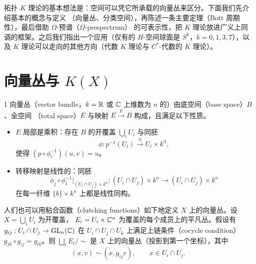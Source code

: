 
拓扑 $K$ 理论的基本想法是：空间可以凭它所承载的向量丛来区分。下面我们先介绍基本的概念与定义
（向量丛、分类空间），再陈述一条主要定理（Bott 周期性），最后借助 $\Omega$-预谱（$\Omega$-prespectrum）
的可表示性，把 $K$ 理论放进广义上同调的框架。之后我们指出一个应用（仅有的 $H$-空间球面是
$S^k$，$k=0,1,3,7$），以及 $K$ 理论可以走向的其他方向（代数 $K$ 理论与 $C^*$-代数的 $K$ 理论）。

\section{向量丛与 $K(X)$}

\begin{defn}{1}
  向量丛（vector bundle，$k=\mathbb{R}$ 或 $\mathbb{C}$ 上维数为 $n$ 的）由底空间（base space）$B$、全空间
  （total space）$E$ 与映射 $E\xrightarrow{p}B$ 构成，且满足以下性质。
  \begin{itemize}[leftmargin=1.6em,itemsep=2pt]
    \item $E$ 局部是乘积：存在 $B$ 的开覆盖 $\bigcup_i U_i$ 与同胚
      \[ \phi : p^{-1}(U_i) \xrightarrow{\ \cong\ } U_i\times k^n , \]
      使得 $(p\circ\phi_i^{-1})(u,v)=u$。
    \item 转移映射是线性的：同胚
      \[ \phi_j\circ\phi_i^{-1}\big|_{(U_i\cap U_j)\times k^n} :
         (U_i\cap U_j)\times k^n \longrightarrow (U_i\cap U_j)\times k^n \]
      在每一纤维 $\{b\}\times k^n$ 上都是线性同构。
  \end{itemize}
\end{defn}

人们也可以用粘合函数（clutching functions）如下地定义 $X$ 上的向量丛。设 $X=\bigcup_i U_i$ 为开覆盖，
$E_i=U_i\times\mathbb{C}^n$ 为覆盖的每个成员上的平凡丛。假设有 $g_{ij}:U_i\cap U_j\to\operatorname{GL}_n(\mathbb{C})$ 在
$U_i\cap U_j\cap U_k$ 上满足上链条件（cocycle condition）$g_{jk}\circ g_{ij}=g_{ik}$。则
$\bigsqcup_i E_i/\sim$ 是 $X$ 上的向量丛（投影到第一个坐标），其中
\[ (x,v)\sim(x,g_{ij}v),\qquad x\in U_i\cap U_j . \]

